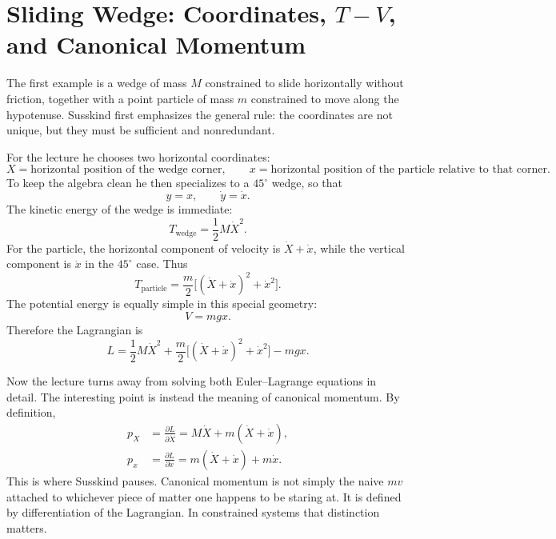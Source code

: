 \section{Sliding Wedge: Coordinates, \texorpdfstring{$T-V$}{T-V}, and Canonical Momentum}

The first example is a wedge of mass \(M\) constrained to slide horizontally without friction, together with a point particle of mass \(m\) constrained to move along the hypotenuse. Susskind first emphasizes the general rule: the coordinates are not unique, but they must be sufficient and nonredundant.

For the lecture he chooses two horizontal coordinates:
\[
X=\text{horizontal position of the wedge corner},\qquad
x=\text{horizontal position of the particle relative to that corner}.
\]
To keep the algebra clean he then specializes to a \(45^\circ\) wedge, so that
\[
y=x,\qquad \dot y=\dot x.
\]
The kinetic energy of the wedge is immediate:
\begin{equation}
T_{\text{wedge}}=\frac12 M\dot X^2.
\end{equation}
For the particle, the horizontal component of velocity is \(\dot X+\dot x\), while the vertical component is \(\dot x\) in the \(45^\circ\) case. Thus
\begin{equation}
T_{\text{particle}}=\frac m2\Big[(\dot X+\dot x)^2+\dot x^2\Big].
\end{equation}
The potential energy is equally simple in this special geometry:
\begin{equation}
V=mgx.
\end{equation}
Therefore the Lagrangian is
\begin{equation}
L=\frac12 M\dot X^2+\frac m2\Big[(\dot X+\dot x)^2+\dot x^2\Big]-mgx.
\end{equation}

Now the lecture turns away from solving both Euler--Lagrange equations in detail. The interesting point is instead the meaning of canonical momentum. By definition,
\begin{align}
p_X&=\frac{\partial L}{\partial \dot X}
   =M\dot X+m(\dot X+\dot x),\\
p_x&=\frac{\partial L}{\partial \dot x}
   =m(\dot X+\dot x)+m\dot x.
\end{align}
This is where Susskind pauses. Canonical momentum is not simply the naive \(mv\) attached to whichever piece of matter one happens to be staring at. It is defined by differentiation of the Lagrangian. In constrained systems that distinction matters.

